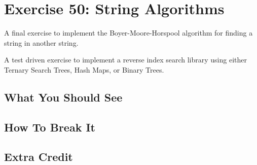 \chapter{Exercise 50: String Algorithms}

A final exercise to implement the Boyer-Moore-Horspool algorithm for finding a string in another
string.

A test driven exercise to implement a reverse index search library using either Ternary Search Trees,
Hash Maps, or Binary Trees.


\section{What You Should See}


\section{How To Break It}


\section{Extra Credit}



